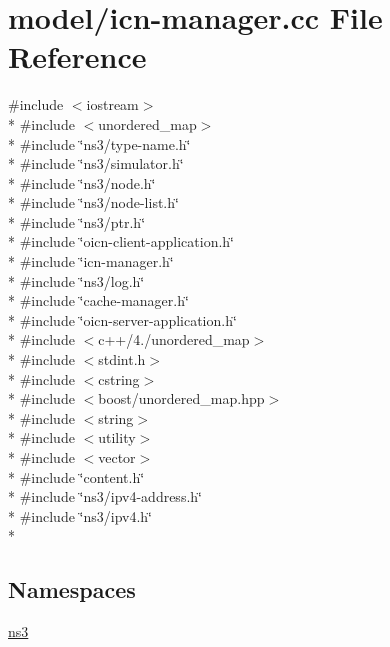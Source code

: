 \hypertarget{icn-manager_8cc}{\section{model/icn-\/manager.cc File Reference}
\label{icn-manager_8cc}
}
{\ttfamily \#include $<$iostream$>$}\\*
{\ttfamily \#include $<$unordered\-\_\-map$>$}\\*
{\ttfamily \#include \char`\"{}ns3/type-\/name.\-h\char`\"{}}\\*
{\ttfamily \#include \char`\"{}ns3/simulator.\-h\char`\"{}}\\*
{\ttfamily \#include \char`\"{}ns3/node.\-h\char`\"{}}\\*
{\ttfamily \#include \char`\"{}ns3/node-\/list.\-h\char`\"{}}\\*
{\ttfamily \#include \char`\"{}ns3/ptr.\-h\char`\"{}}\\*
{\ttfamily \#include \char`\"{}oicn-\/client-\/application.\-h\char`\"{}}\\*
{\ttfamily \#include \char`\"{}icn-\/manager.\-h\char`\"{}}\\*
{\ttfamily \#include \char`\"{}ns3/log.\-h\char`\"{}}\\*
{\ttfamily \#include \char`\"{}cache-\/manager.\-h\char`\"{}}\\*
{\ttfamily \#include \char`\"{}oicn-\/server-\/application.\-h\char`\"{}}\\*
{\ttfamily \#include $<$c++/4./unordered\-\_\-map$>$}\\*
{\ttfamily \#include $<$stdint.\-h$>$}\\*
{\ttfamily \#include $<$cstring$>$}\\*
{\ttfamily \#include $<$boost/unordered\-\_\-map.\-hpp$>$}\\*
{\ttfamily \#include $<$string$>$}\\*
{\ttfamily \#include $<$utility$>$}\\*
{\ttfamily \#include $<$vector$>$}\\*
{\ttfamily \#include \char`\"{}content.\-h\char`\"{}}\\*
{\ttfamily \#include \char`\"{}ns3/ipv4-\/address.\-h\char`\"{}}\\*
{\ttfamily \#include \char`\"{}ns3/ipv4.\-h\char`\"{}}\\*
\subsection*{Namespaces}
\begin{DoxyCompactItemize}
\item 
\hyperlink{namespacens3}{ns3}
\end{DoxyCompactItemize}
